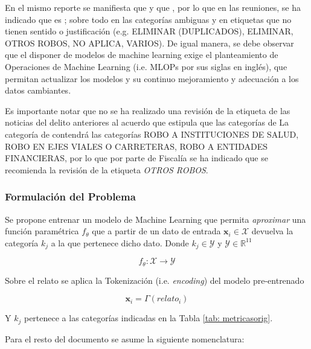 \documentclass[onecolumn, journal, english, 12pt, a4paper]{IEEEtran} %
\theoremstyle{definition}
\begin{document}
En el mismo reporte se manifiesta que  y que , por lo
que en las reuniones, se ha indicado que es ; sobre todo en las categorías
ambiguas y en etiquetas que no tienen sentido o justificación
(e.g. ELIMINAR (DUPLICADOS), ELIMINAR, OTROS ROBOS, NO APLICA,
VARIOS). De igual manera, se debe observar que el disponer de modelos
de machine learning exige el planteamiento de Operaciones de Machine
Learning (i.e. MLOPs por sus siglas en inglés), que permitan
actualizar los modelos y su continuo mejoramiento y adecuación a los
datos cambiantes.

Es importante notar que no se ha realizado una revisión de la etiqueta
 de las noticias del delito anteriores al acuerdo que
estipula que las categorías de La categoría de 
contendrá las categorías ROBO A INSTITUCIONES DE SALUD, ROBO EN EJES
VIALES O CARRETERAS, ROBO A ENTIDADES FINANCIERAS, por lo que por
parte de Fiscalía se ha indicado que se recomienda la revisión de la
etiqueta \emph{OTROS ROBOS}.


\subsubsection{Formulación del Problema}
Se propone entrenar un modelo de Machine Learning que permita
\emph{aproximar} una función paramétrica $f_\theta$ que a partir de un
dato de entrada $\mathbf{x}_i \in \mathbf{\mathcal{X}}$ devuelva la
categoría $k_j$ a la que pertenece dicho dato. Donde
$k_j \in \mathcal{Y}$ y $\mathcal{Y} \in \mathbb{R}^{11}$

\begin{equation}\label{eq:clasificacion}
  f_\theta: \mathbf{\mathcal{X}} \longrightarrow \mathbf{\mathcal{Y}}
\end{equation}

Sobre el relato se aplica la Tokenización (i.e. \emph{encoding}) del
modelo pre-entrenado

\begin{equation}
  \mathbf{x}_i = \Gamma(relato_i)
\end{equation}

Y $k_j$ pertenece a las categorías indicadas en la Tabla \ref{tab: metricasorig}.

Para el resto del documento se asume la siguiente nomenclatura:
\end{document}
